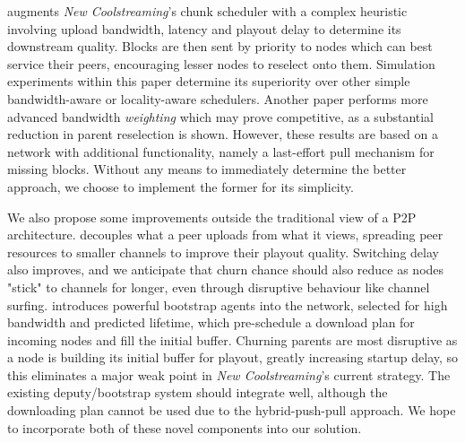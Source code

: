 \documentclass[12pt,a4paper]{article}
\begin{document}
\cite{Ho2014} augments \textit{New Coolstreaming}'s chunk scheduler with a complex heuristic involving upload bandwidth, latency and playout delay to determine its downstream quality. Blocks are then sent by priority to nodes which can best service their peers, encouraging lesser nodes to reselect onto them. Simulation experiments within this paper determine its superiority over other simple bandwidth-aware or locality-aware schedulers. Another paper \cite{Li2010} performs more advanced bandwidth \textit{weighting} which may prove competitive, as a substantial reduction in parent reselection is shown. However, these results are based on a network with additional functionality, namely a last-effort pull mechanism for missing blocks. Without any means to immediately determine the better approach, we choose to implement the former for its simplicity.

We also propose some improvements outside the traditional view of a P2P architecture. \cite{Wu2009} decouples what a peer uploads from what it views, spreading peer resources to smaller channels to improve their playout quality. Switching delay also improves, and we anticipate that churn chance should also reduce as nodes "stick" to channels for longer, even through disruptive behaviour like channel surfing. \cite{Huang2010} introduces powerful bootstrap agents into  the network, selected for high bandwidth and predicted lifetime, which pre-schedule a download plan for incoming nodes and fill the initial buffer. Churning parents are most disruptive as a node is building its initial buffer for playout, greatly increasing startup delay, so this eliminates a major weak point in \textit{New Coolstreaming}'s current strategy. The existing deputy/bootstrap system should integrate well, although the downloading plan cannot be used due to the hybrid-push-pull approach. We hope to incorporate both of these novel components into our solution.
\end{document}
